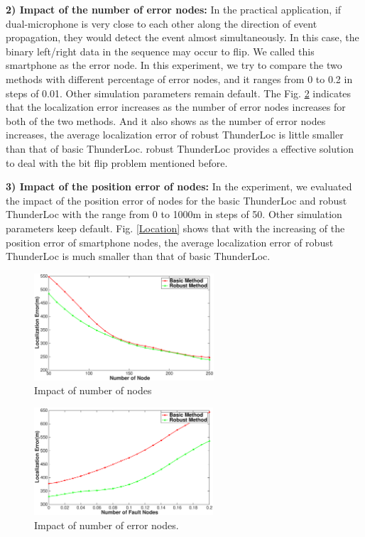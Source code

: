  \textbf{2) Impact of the number of error nodes:}
In the practical application, if dual-microphone is very close to each other along the direction of event propagation, they
would detect the event almost simultaneously. In this case, the binary left/right data in the sequence may occur to flip. 
We called this smartphone as the error node.
In this experiment, we try to compare the two methods with different percentage of error nodes, and it ranges from 0 to 0.2 in steps of 0.01. 
Other simulation parameters remain default. The Fig. \ref{Faulty_Node} indicates that the localization error increases as the number of error nodes increases for both of the two methods. 
And it also shows as the number of error nodes increases, the average localization error of robust ThunderLoc is little smaller than that of basic ThunderLoc.
robust ThunderLoc provides a effective solution to deal with the bit flip problem mentioned before.
  
 \textbf{3) Impact of the position error of nodes:}
In the experiment, we evaluated the impact of the position error of nodes for the basic ThunderLoc and robust ThunderLoc with the range from 0 to 1000m in steps of 50. 
Other simulation parameters keep default. Fig. \ref{Location} shows that with the increasing of the position error of smartphone nodes, the average localization error of robust ThunderLoc is much smaller than that of basic ThunderLoc.

    \begin{figure}[hptb]
            \setlength{\abovecaptionskip}{0pt}
            \centering
            \includegraphics[scale=1.4,height=4.0cm]{image/Node_Number.eps}
     \vspace{2mm}
            \caption{Impact of number of nodes}
            \label{Node_Number}
            \vspace{-6mm}
  \end{figure}

\begin{figure}[hptb]
            \setlength{\abovecaptionskip}{0pt}
            \centering
            \includegraphics[scale=1.4,height=4.0cm]{image/Faulty_Node.eps}
     \vspace{2mm}
            \caption{Impact of number of error nodes.}
            \label{Faulty_Node}
            \vspace{-6mm}
  \end{figure}

